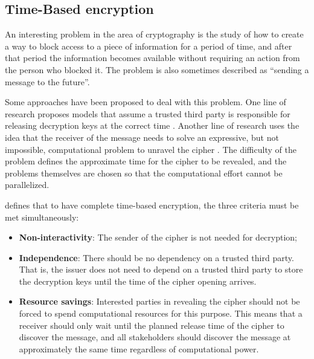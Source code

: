 \documentclass[english]{textolivre}
\begin{document}


\subsection{Time-Based encryption \label{sec-time}}

An interesting problem in the area of cryptography is the study of how to create a way to block access to a piece of information for a period of time, and after that period the information becomes available without requiring an action from the person who blocked it. The problem is also sometimes described as “sending a message to the future”.

Some approaches have been proposed to deal with this problem. One line of research proposes models that assume a trusted third party is responsible for releasing decryption keys at the correct time \cite{rivest1996time, boneh2005hierarchical, palestrinha}. Another line of research uses the idea that the receiver of the message needs to solve an expressive, but not impossible, computational problem to unravel the cipher \cite{timedcommitments, unruh2015revocable}. The difficulty of the problem defines the approximate time for the cipher to be revealed, and the problems themselves are chosen so that the computational effort cannot be parallelized.


\textcite{Liu} defines that to have complete time-based encryption, the three criteria must be met simultaneously:

\begin{itemize}

\item \textbf{Non-interactivity}: The sender of the cipher is not needed for decryption;
\item \textbf{Independence}: There should be no dependency on a trusted third party. That is, the issuer does not need to depend on a trusted third party to store the decryption keys until the time of the cipher opening arrives.
\item \textbf{Resource savings}: Interested parties in revealing the cipher should not be forced to spend computational resources for this purpose. This means that a receiver should only wait until the planned release time of the cipher to discover the message, and all stakeholders should discover the message at approximately the same time regardless of computational power.

\end{itemize}
\end{document}
